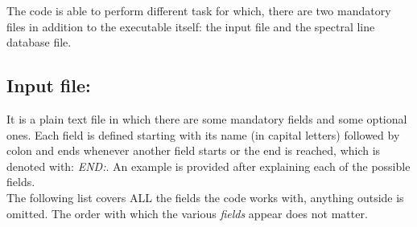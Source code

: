 %
The code is able to perform different task for which, there are two mandatory files in addition to the executable itself: the input file and the spectral line database file.
%
\subsection{Input file:}
It is a plain text file in which there are some mandatory fields and some optional ones. Each field is defined starting with its name (in capital letters) followed by colon and ends whenever another field starts or the end is reached, which is denoted with: {\it END:}. An example is provided after explaining each of the possible fields.\\

The following list covers ALL the fields the code works with, anything outside is omitted. The order with which the various {\it fields} appear does not matter.\\
